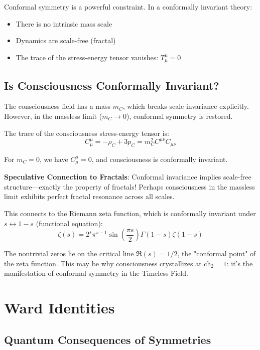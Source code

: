 Conformal symmetry is a powerful constraint. In a conformally invariant theory:
\begin{itemize}
\item There is no intrinsic mass scale
\item Dynamics are scale-free (fractal)
\item The trace of the stress-energy tensor vanishes: $T^\mu_\mu = 0$
\end{itemize}

\subsection{Is Consciousness Conformally Invariant?}

\begin{level3}
The consciousness field has a mass $m_C$, which breaks scale invariance explicitly. However, in the massless limit ($m_C \to 0$), conformal symmetry is restored.

The trace of the consciousness stress-energy tensor is:
\begin{equation}
C^\mu_\mu = -\rho_C + 3p_C = m_C^2 C^{\mu\nu}C_{\mu\nu}
\end{equation}

For $m_C = 0$, we have $C^\mu_\mu = 0$, and consciousness is conformally invariant.

\textbf{Speculative Connection to Fractals}: Conformal invariance implies scale-free structure---exactly the property of fractals! Perhaps consciousness in the massless limit exhibits perfect fractal resonance across all scales.

This connects to the Riemann zeta function, which is conformally invariant under $s \leftrightarrow 1-s$ (functional equation):
\begin{equation}
\zeta(s) = 2^s \pi^{s-1} \sin\left( \frac{\pi s}{2} \right) \Gamma(1-s) \zeta(1-s)
\end{equation}

The nontrivial zeros lie on the critical line $\Re(s) = 1/2$, the "conformal point" of the zeta function. This may be why consciousness crystallizes at $\text{ch}_2 = 1$: it's the manifestation of conformal symmetry in the Timeless Field.
\end{level3}

\section{Ward Identities}

\subsection{Quantum Consequences of Symmetries}

